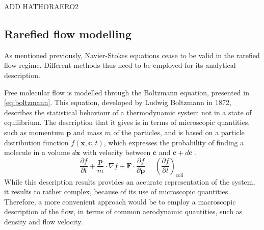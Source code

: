 ADD HATHORAERO2

\subsection{Rarefied flow modelling}
As mentioned previously, Navier-Stokes equations cease to be valid in the rarefied flow regime. Different methods thus need to be employed for its analytical description.

Free molecular flow is modelled through the Boltzmann equation, presented in \autoref{eq:boltzmann}. This equation, developed by Ludwig Boltzmann in 1872, describes the statistical behaviour of a thermodynamic system not in a state of equilibrium. The description that it gives is in terms of microscopic quantities, such as momentum $\mathbf{p}$ and mass $m$ of the particles, and is based on a particle distribution function $f (\mathbf{x}, \mathbf{c},t)$, which expresses the probability of finding a molecule in a volume $d\mathbf{x}$ with velocity between $\mathbf{c}$ and $\mathbf{c} + d \mathbf{c}$ \cite{burnett}.
\begin{equation}
    \frac{\partial f}{\partial t}+\frac{\mathbf{p}}{m} \cdot \nabla f+\mathbf{F} \cdot \frac{\partial f}{\partial \mathbf{p}}=\left(\frac{\partial f}{\partial t}\right)_{\text {coll }}
    \label{eq:boltzmann}
\end{equation}
While this description results provides an accurate representation of the system, it results to rather complex, because of its use of microscopic quantities. Therefore, a more convenient approach would be to employ a macroscopic description of the flow, in terms of common aerodynamic quantities, such as density and flow velocity.

